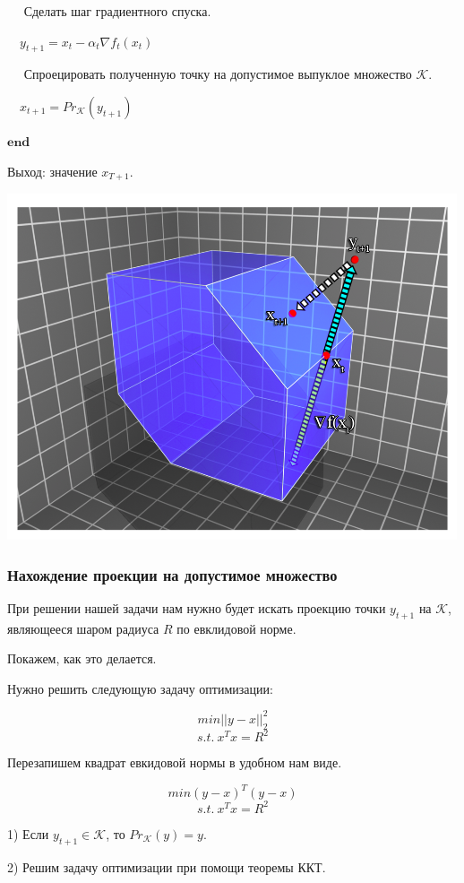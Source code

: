 \documentclass[12pt]{article}
\begin{document}
$\quad$ Сделать шаг градиентного спуска.

$\quad y_{t+1} = x_t - \alpha_t \nabla f_t(x_t)$

$\quad$ Спроецировать полученную точку на допустимое выпуклое множество $\mathcal{K}$.

$\quad x_{t+1} = Pr_{\mathcal{K}}(y_{t+1})$

$\textbf{end}$

Выход: значение $x_{T+1}$.

\includegraphics[width=\linewidth]{gradient_descent.png}

\subsubsection*{Нахождение проекции на допустимое множество}

При решении нашей задачи нам нужно будет искать проекцию точки $y_{t+1}$ на $\mathcal{K}$, являющееся шаром радиуса $R$ по евклидовой норме.

Покажем, как это делается.

Нужно решить следующую задачу оптимизации:

$$min ||y-x||_2^2$$
$$s.t.\ x^Tx = R^2$$

Перезапишем квадрат евкидовой нормы в удобном нам виде.

$$min (y-x)^T(y-x)$$
$$s.t.\ x^Tx = R^2$$

1) Если $y_{t+1} \in \mathcal{K}$, то $Pr_{\mathcal{K}}(y) = y$.

2) Решим задачу оптимизации при помощи теоремы ККТ.
\end{document}
